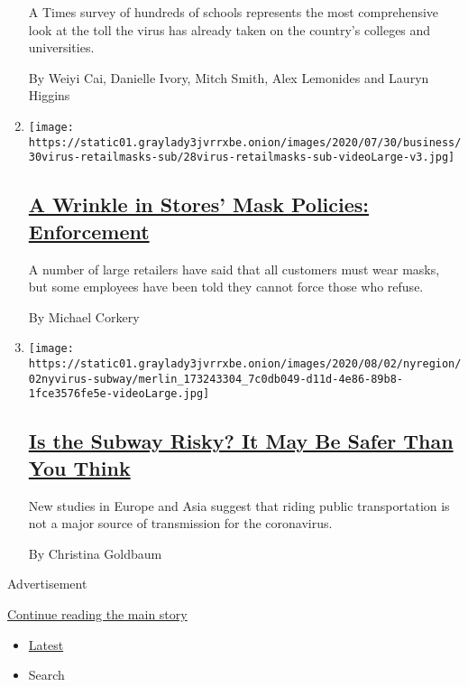 \begin{enumerate}
  A Times survey of hundreds of schools represents the most
  comprehensive look at the toll the virus has already taken on the
  country's colleges and universities.

  By Weiyi Cai, Danielle Ivory, Mitch Smith, Alex Lemonides and Lauryn
  Higgins
\item
  \texttt{[image: https://static01.graylady3jvrrxbe.onion/images/2020/07/30/business/30virus-retailmasks-sub/28virus-retailmasks-sub-videoLarge-v3.jpg]}

  \hypertarget{a-wrinkle-in-stores-mask-policies-enforcement}{%
  \subsection{\texorpdfstring{\href{/2020/07/29/business/coronavirus-masks-stores-walmart.html}{A
  Wrinkle in Stores' Mask Policies:
  Enforcement}}{A Wrinkle in Stores' Mask Policies: Enforcement}}\label{a-wrinkle-in-stores-mask-policies-enforcement}}

  A number of large retailers have said that all customers must wear
  masks, but some employees have been told they cannot force those who
  refuse.

  By Michael Corkery
\item
  \texttt{[image: https://static01.graylady3jvrrxbe.onion/images/2020/08/02/nyregion/02nyvirus-subway/merlin\_173243304\_7c0db049-d11d-4e86-89b8-1fce3576fe5e-videoLarge.jpg]}

  \hypertarget{is-the-subway-risky-it-may-be-safer-than-you-think}{%
  \subsection{\texorpdfstring{\href{/2020/08/02/nyregion/nyc-subway-coronavirus-safety.html}{Is
  the Subway Risky? It May Be Safer Than You
  Think}}{Is the Subway Risky? It May Be Safer Than You Think}}\label{is-the-subway-risky-it-may-be-safer-than-you-think}}

  New studies in Europe and Asia suggest that riding public
  transportation is not a major source of transmission for the
  coronavirus.

  By Christina Goldbaum
\end{enumerate}

Advertisement

\protect\hyperlink{after-mid2}{Continue reading the main story}

\begin{itemize}
\tightlist
\item
  \protect\hyperlink{stream-panel}{Latest}
\item
  Search
\end{itemize}

